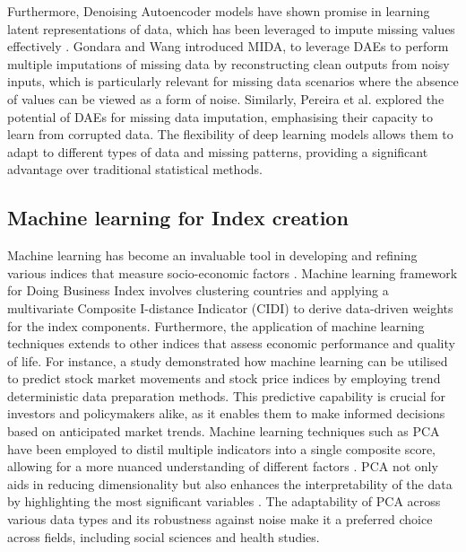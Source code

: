 Furthermore,  Denoising Autoencoder models \cite{Chen_Shi} have shown promise in learning latent representations of data, which has been leveraged to impute missing values effectively \cite{Lall_Robin}. Gondara and Wang \cite{Gondara_Wang} introduced MIDA, to leverage  DAEs to perform multiple imputations of missing data by reconstructing clean outputs from noisy inputs, which is particularly relevant for missing data scenarios where the absence of values can be viewed as a form of noise. Similarly, Pereira et al. \cite{Pereira_Santos} explored the potential of DAEs for missing data imputation, emphasising their capacity to learn from corrupted data. 
The flexibility of deep learning models allows them to adapt to different types of data and missing patterns, providing a significant advantage over traditional statistical methods.

\subsection{Machine learning for Index creation}
 

Machine learning has become an invaluable tool in developing and refining various indices that measure socio-economic factors \cite{keys2021machine}. Machine learning framework for  Doing Business Index \cite{DBI}  involves clustering countries and applying a multivariate Composite I-distance Indicator (CIDI) to derive data-driven weights for the index components. Furthermore, the application of machine learning techniques extends to other indices that assess economic performance and quality of life. For instance, a study demonstrated how machine learning can be utilised to predict stock market movements and stock price indices by employing trend deterministic data preparation methods\cite{Stock_Index}. This predictive capability is crucial for investors and policymakers alike, as it enables them to make informed decisions based on anticipated market trends. Machine learning techniques such as PCA have been employed to distil multiple indicators into a single composite score, allowing for a more nuanced understanding of different factors \cite{Reddy_reduction}.  PCA not only aids in reducing dimensionality but also enhances the interpretability of the data by highlighting the most significant variables \cite{Hiles_Dutcher}. The adaptability of PCA across various data types and its robustness against noise make it a preferred choice across fields, including social sciences\cite{Belay_Wondimu} and health studies\cite{Nowroozi_Roshani}. 
 

